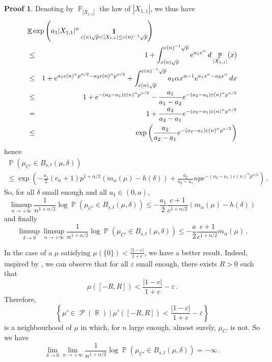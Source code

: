 \documentclass[11pt,a4paper]{article}
\DeclareMathOperator{\E}{\mathbb{E}}
\DeclareMathOperator{\R}{\mathbb{R}}
\DeclareMathOperator{\PR}{\mathbb{P}}
\DeclareMathOperator{\PP}{\mathcal{P}}
\DeclareMathOperator{\1}{\mathbf{1}}
\theoremstyle{definition}
\newtheorem*{Proof}{Proof}
\begin{document}
\begin{Proof}
Denoting by $\PR_{|X_{1,1}|}$ the law of $|X_{1,1}|$, we thus have
\begin{eqnarray*}
\lefteqn{   \E \exp \left( a_1 |X_{1,1}|^{\alpha} \1_{\varepsilon(n) \sqrt{p} < |X_{1,1}| \le \varepsilon(n)^{-1} \sqrt{p}} \right)   } \\
& \le & 1 + \int_{\varepsilon(n) \sqrt{p}}^{\varepsilon(n)^{-1} \sqrt{p}} e^{a_1 x^{\alpha}} \, d\PR_{|X_{1,1}|}(x) \\
& \le & 1 + e^{a_1 \varepsilon(n)^{\alpha} p^{\alpha/2} - a_2 \varepsilon(n)^{\alpha} p^{\alpha/2}} + \int_{\varepsilon(n) \sqrt{p}}^{\varepsilon(n)^{-1} \sqrt{p}} a_1 \alpha x^{\alpha-1} e^{a_1 x^{\alpha} - a_2 x^{\alpha}} \, dx \\
& \le & 1 + e^{-(a_2-a_1) \varepsilon(n)^{\alpha} p^{\alpha/2}} - \frac{a_1}{a_1-a_2} e^{-(a_2-a_1) \varepsilon(n)^{\alpha} p^{\alpha/2}} \\
& = & 1 + \frac{a_2}{a_2-a_1} e^{-(a_2-a_1) \varepsilon(n)^{\alpha} p^{\alpha/2}} \\
& \le & \exp \left( \frac{a_2}{a_2-a_1} e^{-(a_2-a_1) \varepsilon(n)^{\alpha} p^{\alpha/2}} \right)
\end{eqnarray*}
hence
\begin{multline*}
\PR(\mu_{C'} \in B_{s,t}(\mu,\delta)) \\
\le \exp \left( -\frac{a_1}{2} (c_n+1) p^{1+\alpha/2} (m_{\alpha}(\mu)-h(\delta)) + \frac{a_2}{a_2-a_1} np e^{-(a_2-a_1) \varepsilon(n)^{\alpha} p^{\alpha/2}} \right) \, .
\end{multline*}
So, for all $\delta$ small enough and all $a_1 \in (0,a)$,
\begin{displaymath}
\limsup_{n \to +\infty} \frac{1}{n^{1+\alpha/2}} \log \PR(\mu_{C'} \in B_{s,t}(\mu,\delta)) \le -\frac{a_1}{2} \frac{c+1}{c^{1+\alpha/2}} (m_{\alpha}(\mu) - h(\delta))
\end{displaymath}
and finally
\begin{equation} \label{LDP_C'_eq1}
\limsup_{\delta \to 0} \limsup_{n \to +\infty} \frac{1}{n^{1+\alpha/2}} \log \PR(\mu_{C'} \in B_{s,t}(\mu,\delta)) \le -\frac{a}{2} \frac{c+1}{c^{1+\alpha/2}} m_{\alpha}(\mu) \, .
\end{equation}

In the case of a $\mu$ satisfying $\mu(\{0\}) < \frac{|1-c|}{1+c}$, we have a better result. Indeed, inspired by \cite{HP}, we can observe that for all $\varepsilon$ small enough, there exists $R>0$ such that
\begin{displaymath}
\mu([-R,R]) < \frac{|1-c|}{1+c} - \varepsilon \, .
\end{displaymath}
Therefore,
\begin{displaymath}
\left\{ \mu' \in \PP(\R) \ | \ \mu'([-R,R]) < \frac{|1-c|}{1+c} - \varepsilon \right\}
\end{displaymath}
is a neighbourhood of $\mu$ in which, for $n$ large enough, almost surely, $\mu_{C'}$ is not. So we have
\begin{equation} \label{LDP_C'_eq2}
\lim_{\delta \to 0} \lim_{n \to +\infty} \frac{1}{n^{1+\alpha/2}} \log \PR(\mu_{C'} \in B_{s,t}(\mu,\delta)) = -\infty \, .
\end{equation}


\end{Proof}
\end{document}
